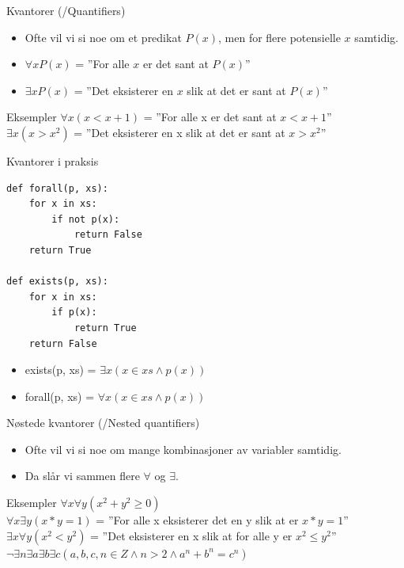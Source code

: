 \begin{frame}{Kvantorer (/Quantifiers)}
    \begin{itemize}
        \item Ofte vil vi si noe om et predikat $P(x)$, men for flere potensielle $x$ samtidig.
        \item $\forall x P(x)$ = ''For alle $x$ er det sant at $P(x)$''
        \item $\exists x P(x)$ = ''Det eksisterer en $x$ slik at det er sant at $P(x)$''
    \end{itemize}
    
    \pause
    \begin{block}{Eksempler}
        $\forall x (x < x + 1)$ = ''For alle x er det sant at $x < x +1$''\\[5mm]
        $\exists x (x > x^2)$ = ''Det eksisterer en x slik at det er sant at $x > x^2$''
    \end{block}
\end{frame}

\begin{frame}[fragile]{Kvantorer i praksis}
    \begin{verbatim}
def forall(p, xs):
    for x in xs:
        if not p(x):
            return False
    return True
    
def exists(p, xs):
    for x in xs:
        if p(x):
            return True
    return False
    \end{verbatim}
    
    \pause
    \begin{itemize}
        \item exists(p, xs) = $\exists x (x \in xs \land p(x))$
        \item forall(p, xs) = $\forall x (x \in xs \land p(x))$
    \end{itemize}
\end{frame}

\begin{frame}{Nøstede kvantorer (/Nested quantifiers)}
    \begin{itemize}
        \item Ofte vil vi si noe om mange kombinasjoner av variabler samtidig.
        \item Da slår vi sammen flere $\forall$ og $\exists$.
    \end{itemize}
    
    \begin{block}{Eksempler}
        $\forall x \forall y (x^2 + y^2 \geq 0)$ \\
        $\forall x \exists y (x * y = 1)$ = ''For alle x eksisterer det en y slik at er $x * y = 1$'' \\
        $\exists x \forall y (x^2 < y^2)$ = ''Det eksisterer en x slik at for alle y er $x^2 \leq y^2$''\\
        $\lnot \exists n \exists a \exists b \exists c (a,b,c,n \in Z \land n > 2 \land a^n + b^n = c^n)$
    \end{block}
\end{frame}

